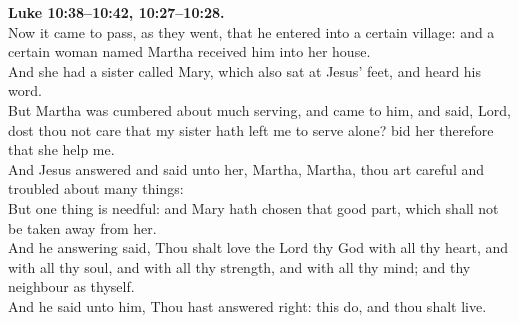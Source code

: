 \documentclass[12pt]{article} %
\begin{document}
{\begin{minipage}[t]{0.45\textwidth}
\textbf{Luke 10:38--10:42, 10:27--10:28.}\\
Now it came to pass, as they went, that he entered into a certain village: and a certain woman named Martha received him into her house.\\
And she had a sister called Mary, which also sat at Jesus' feet, and heard his word.\\
But Martha was cumbered about much serving, and came to him, and said, Lord, dost thou not care that my sister hath left me to serve alone? bid her therefore that she help me.\\
And Jesus answered and said unto her, Martha, Martha, thou art careful and troubled about many things:\\
But one thing is needful: and Mary hath chosen that good part, which shall not be taken away from her.\\
And he answering said, Thou shalt love the Lord thy God with all thy heart, and with all thy soul, and with all thy strength, and with all thy mind; and thy neighbour as thyself.\\
And he said unto him, Thou hast answered right: this do, and thou shalt live.\\

\end{minipage}}
\vspace*{\fill}
\newpage
\Huge%
\vspace*{\fill}
\begin{spacing}{1.0}
\end{spacing}
\vspace*{\fill}
\end{document}
